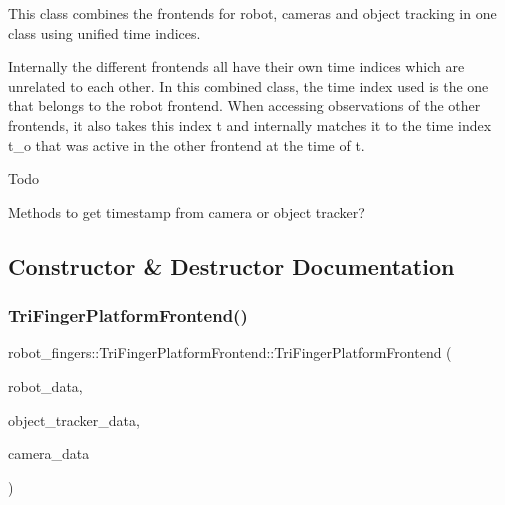 This class combines the frontends for robot, cameras and object tracking in one class using unified time indices.

Internally the different frontends all have their own time indices which are unrelated to each other. In this combined class, the time index used is the one that belongs to the robot frontend. When accessing observations of the other frontends, it also takes this index t and internally matches it to the time index t\+\_\+o that was active in the other frontend at the time of t.

\begin{DoxyRefDesc}{Todo}
\item[\hyperlink{todo__todo000001}{Todo}]Methods to get timestamp from camera or object tracker? \end{DoxyRefDesc}


\subsection{Constructor \& Destructor Documentation}
\mbox{\label{classrobot__fingers_1_1TriFingerPlatformFrontend_a47150cf36520116808333d5c3e8a2fdc}} 
\subsubsection{\texorpdfstring{Tri\+Finger\+Platform\+Frontend()}{TriFingerPlatformFrontend()}\hspace{0.1cm}{\footnotesize\ttfamily [1/2]}}
{\footnotesize\ttfamily robot\+\_\+fingers\+::\+Tri\+Finger\+Platform\+Frontend\+::\+Tri\+Finger\+Platform\+Frontend (\begin{DoxyParamCaption}\item[{robot\+\_\+interfaces\+::\+Tri\+Finger\+Types\+::\+Base\+Data\+Ptr}]{robot\+\_\+data,  }\item[{trifinger\+\_\+object\+\_\+tracking\+::\+Object\+Tracker\+Data\+::\+Ptr}]{object\+\_\+tracker\+\_\+data,  }\item[{std\+::shared\+\_\+ptr$<$ robot\+\_\+interfaces\+::\+Sensor\+Data$<$ Camera\+Observation $>$$>$}]{camera\+\_\+data }\end{DoxyParamCaption})}




